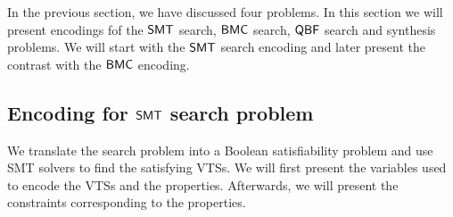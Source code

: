 %
%
%

In the previous section, we have discussed four problems.
%
In this section we will present encodings fof the
$\mathsf{SMT}$ search, $\mathsf{BMC}$ search, $\mathsf{QBF}$ search and synthesis problems.
%
We will start with the $\mathsf{SMT}$ search encoding and later present the
contrast with the $\mathsf{BMC}$ encoding.

\subsection{Encoding for $\mathsf{SMT}$ search problem}
\label{enc:smt}

We translate the search problem into a Boolean satisfiability
problem and use SMT solvers to find the satisfying VTSs.
%
We will first present the variables used to encode the
VTSs and the properties.
%
Afterwards, we will present the constraints corresponding to the
properties.

